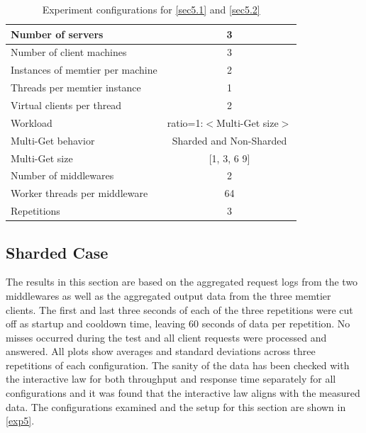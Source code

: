 \documentclass[11pt,a4paper]{article}
\begin{document}
\begin{center}
    \begin{table}[H]
        \centering
    	\begin{tabular}{|l|c|}
    		\hline Number of servers                & 3                            \\ 
    		\hline Number of client machines        & 3                            \\ 
    		\hline Instances of memtier per machine & 2                            \\ 
    		\hline Threads per memtier instance     & 1                            \\
    		\hline Virtual clients per thread       & 2                		       \\ 
    		\hline Workload                         & ratio=1:$<$Multi-Get size$>$ \\
    		\hline Multi-Get behavior               & Sharded and Non-Sharded      \\
    		\hline Multi-Get size                   & [1, 3, 6 9]                  \\
    		\hline Number of middlewares            & 2                            \\
    		\hline Worker threads per middleware    & 64                           \\
    		\hline Repetitions                      & 3                            \\ 
    		\hline 
    	\end{tabular}
    	\caption{Experiment configurations for \autoref{sec5.1} and \autoref{sec5.2}} 
    	\label{exp5}
    \end{table}
\end{center}

\subsection{Sharded Case} \label{sec5.1}

The results in this section are based on the aggregated request logs from the two middlewares as well as the aggregated output data from the three memtier clients. The first and last three seconds of each of the three repetitions were cut off as startup and cooldown time, leaving 60 seconds of data per repetition. No misses occurred during the test and all client requests were processed and answered. All plots show averages and standard deviations across three repetitions of each configuration. The sanity of the data has been checked with the interactive law for both throughput and response time separately for all configurations and it was found that the interactive law aligns with the measured data. The configurations examined and the setup for this section are shown in \autoref{exp5}.
\end{document}
